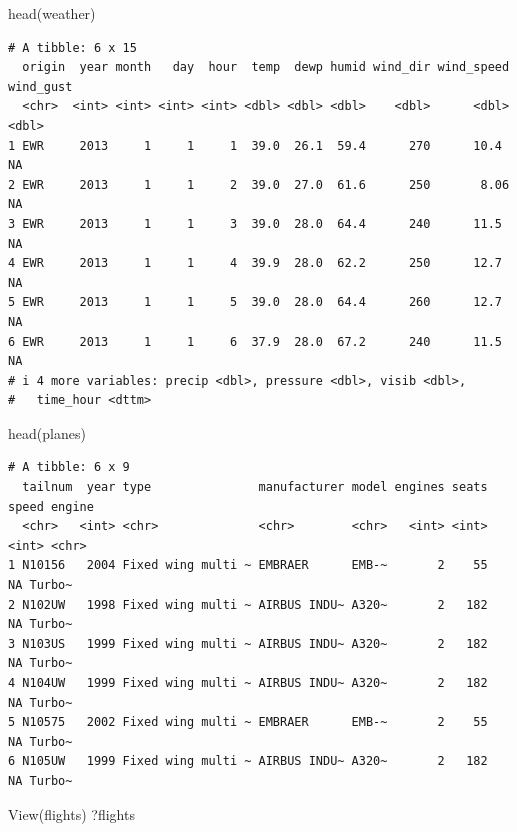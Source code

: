 \documentclass[
  letterpaper,
  DIV=11,
  numbers=noendperiod]{scrreprt}
\newenvironment{Shaded}{\begin{snugshade}}{\end{snugshade}}
\newcommand{\FunctionTok}[1]{\textcolor[rgb]{0.28,0.35,0.67}{#1}}
\newcommand{\NormalTok}[1]{\textcolor[rgb]{0.00,0.23,0.31}{#1}}
\begin{document}
\begin{Shaded}
\begin{Highlighting}[]
\FunctionTok{head}\NormalTok{(weather)}
\end{Highlighting}
\end{Shaded}

\begin{verbatim}
# A tibble: 6 x 15
  origin  year month   day  hour  temp  dewp humid wind_dir wind_speed wind_gust
  <chr>  <int> <int> <int> <int> <dbl> <dbl> <dbl>    <dbl>      <dbl>     <dbl>
1 EWR     2013     1     1     1  39.0  26.1  59.4      270      10.4         NA
2 EWR     2013     1     1     2  39.0  27.0  61.6      250       8.06        NA
3 EWR     2013     1     1     3  39.0  28.0  64.4      240      11.5         NA
4 EWR     2013     1     1     4  39.9  28.0  62.2      250      12.7         NA
5 EWR     2013     1     1     5  39.0  28.0  64.4      260      12.7         NA
6 EWR     2013     1     1     6  37.9  28.0  67.2      240      11.5         NA
# i 4 more variables: precip <dbl>, pressure <dbl>, visib <dbl>,
#   time_hour <dttm>
\end{verbatim}

\begin{Shaded}
\begin{Highlighting}[]
\FunctionTok{head}\NormalTok{(planes)}
\end{Highlighting}
\end{Shaded}

\begin{verbatim}
# A tibble: 6 x 9
  tailnum  year type               manufacturer model engines seats speed engine
  <chr>   <int> <chr>              <chr>        <chr>   <int> <int> <int> <chr> 
1 N10156   2004 Fixed wing multi ~ EMBRAER      EMB-~       2    55    NA Turbo~
2 N102UW   1998 Fixed wing multi ~ AIRBUS INDU~ A320~       2   182    NA Turbo~
3 N103US   1999 Fixed wing multi ~ AIRBUS INDU~ A320~       2   182    NA Turbo~
4 N104UW   1999 Fixed wing multi ~ AIRBUS INDU~ A320~       2   182    NA Turbo~
5 N10575   2002 Fixed wing multi ~ EMBRAER      EMB-~       2    55    NA Turbo~
6 N105UW   1999 Fixed wing multi ~ AIRBUS INDU~ A320~       2   182    NA Turbo~
\end{verbatim}

\begin{Shaded}
\begin{Highlighting}[]
\FunctionTok{View}\NormalTok{(flights)}
\NormalTok{?flights}
\end{Highlighting}
\end{Shaded}
\end{document}
